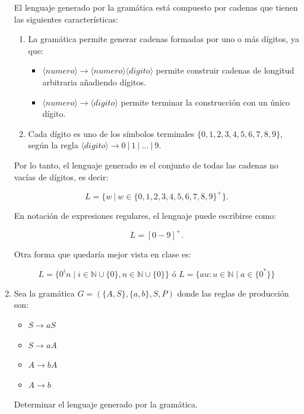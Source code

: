 \documentclass[12pt]{book} %
\begin{document}
\begin{enumerate}
\begin{solucion}[Ejercicio 2.b]
   El lenguaje generado por la gramática está compuesto por cadenas que tienen las siguientes características:

   \begin{enumerate}
       \item La gramática permite generar cadenas formadas por uno o más dígitos, ya que:
           \begin{itemize}
               \item $\langle numero \rangle \to \langle numero \rangle \langle digito \rangle$ permite construir cadenas de longitud arbitraria añadiendo dígitos.
               \item $\langle numero \rangle \to \langle digito \rangle$ permite terminar la construcción con un único dígito.
           \end{itemize}
       \item Cada dígito es uno de los símbolos terminales $\{0, 1, 2, 3, 4, 5, 6, 7, 8, 9\}$, según la regla $\langle digito \rangle \to 0 \ | \ 1 \ | \ \dots \ | \ 9$.
   \end{enumerate}

   Por lo tanto, el lenguaje generado es el conjunto de todas las cadenas no vacías de dígitos, es decir:

   $$
   L = \{ w \ | \ w \in \{0, 1, 2, 3, 4, 5, 6, 7, 8, 9\}^+ \}.
   $$

   En notación de expresiones regulares, el lenguaje puede escribirse como:

   $$
   L = [0-9]^+.
   $$

   Otra forma que quedaría mejor vista en clase es:

   $$
   L = \{0^in \mid i \in \mathbb{N} \cup \{0\} , n \in \mathbb{N} \cup \{0\}  \} \text{ ó } L = \{au : u \in \mathbb{N} \mid a \in \{0^*\}  \}
   $$

   \end{solucion}
\item
  Sea la gramática \(G = (\{A, S\}, \{a, b\}, S, P)\) donde las reglas
  de producción son:\\

  \begin{itemize}
       \item $S \to aS$
       \item $S \to aA$
       \item $A \to bA$
       \item $A \to b$
   \end{itemize}

  Determinar el lenguaje generado por la gramática.


\end{enumerate}
\end{document}
